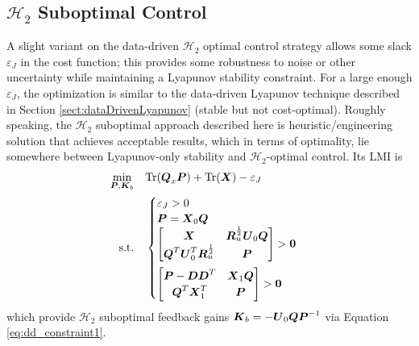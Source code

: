 \subsection{$\mathcal{H}_{2}$ Suboptimal Control}
\label{sect:dataDrivenH2Suboptimal}
A slight variant on the data-driven $\mathcal{H}_{2}$ optimal control strategy allows some slack $\varepsilon_{J}$ in the cost function; this provides some robustness to noise or other uncertainty while maintaining a Lyapunov stability constraint.  For a large enough $\varepsilon_{J}$, the optimization is similar to the data-driven Lyapunov technique described in Section \ref{sect:dataDrivenLyapunov} (stable but not cost-optimal).  Roughly speaking, the $\mathcal{H}_{2}$ suboptimal approach described here is heuristic/engineering solution that achieves acceptable results, which in terms of optimality, lie somewhere between Lyapunov-only stability and $\mathcal{H}_{2}$-optimal control.  Its LMI is
\begin{equation}
\label{eq:h2s_lmi_dd}
\begin{aligned}
	\underset{\vb*{P}, \vb*{K}_{b}}{\min} \quad & \text{Tr}(\vb*{Q}_{x}\vb*{P}) + \text{Tr}(\vb*{X}) - \varepsilon_{J}\\
	\textrm{s.t.} \quad & \begin{cases}
		\varepsilon_{J} > 0\\ \vspace{-15pt}\\
		\vb*{P} = \vb*{X}_{0}\vb*{Q}\\ \vspace{-15pt}\\
		\begin{bmatrix}
			\vb*{X} & \vb*{R}_{u}^{\frac{1}{2}}\vb*{U}_{0}\vb*{Q}\\
			\vb*{Q}^{T}\vb*{U}_{0}^{T}\vb*{R}_{u}^{\frac{1}{2}} & \vb*{P}\\
		\end{bmatrix} > \vb*{0}\\ \vspace{-10pt}\\
		\begin{bmatrix}
			\vb*{P} - \vb*{D}\vb*{D}^{T} & \vb*{X}_{1}\vb*{Q}\\
			\vb*{Q}^{T}\vb*{X}_{1}^{T} & \vb*{P}\\
		\end{bmatrix} > \vb*{0}
	\end{cases}
\end{aligned}
\end{equation}
which provide $\mathcal{H}_{2}$ suboptimal feedback gains $\vb*{K}_{b} = -\vb*{U}_{0}\vb*{Q}\vb*{P}^{-1}$ via Equation \eqref{eq:dd_constraint1}.
